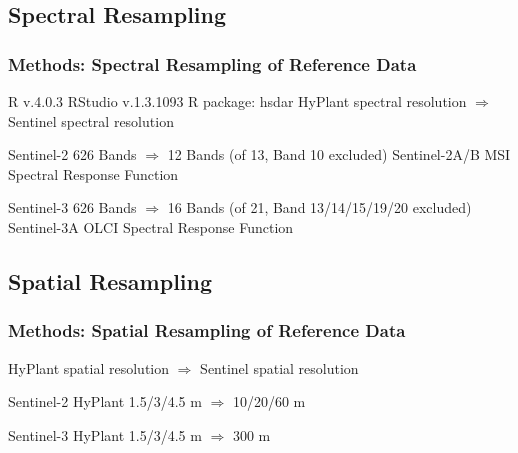 \documentclass[9pt]{beamer}
\begin{document}
\subsection{Spectral Resampling}
\begin{frame}
\frametitle{Methods: Spectral Resampling of Reference Data}
R v.4.0.3\newline
RStudio v.1.3.1093\newline
R package: hsdar\newline\newline
HyPlant spectral resolution $\Rightarrow$ Sentinel spectral resolution
\begin{block}{Sentinel-2}
626 Bands $\Rightarrow$ 12 Bands (of 13, Band 10 excluded)\newline\newline
Sentinel-2A/B MSI Spectral Response Function
\end{block}
\begin{alertblock}{Sentinel-3}
626 Bands $\Rightarrow$ 16 Bands (of 21, Band 13/14/15/19/20 excluded)\newline\newline
Sentinel-3A OLCI Spectral Response Function
\end{alertblock}
\end{frame}

\subsection{Spatial Resampling}
\begin{frame}
\frametitle{Methods: Spatial Resampling of Reference Data}
HyPlant spatial resolution $\Rightarrow$ Sentinel spatial resolution
\begin{block}{Sentinel-2}
HyPlant 1.5/3/4.5 m $\Rightarrow$ 10/20/60 m
\end{block}
\begin{alertblock}{Sentinel-3}
HyPlant 1.5/3/4.5 m $\Rightarrow$ 300 m
\end{alertblock}
\end{frame}
\end{document}
